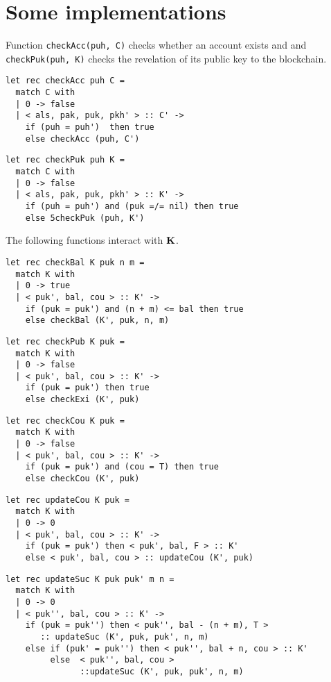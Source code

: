 \documentclass[a4paper]{llncs}
\begin{document}
\section{Some implementations}
Function \verb!checkAcc(puh, C)! checks whether an account exists and and \verb!checkPuk(puh, K)! checks the revelation of its public key to the blockchain.
\begin{verbatim}
let rec checkAcc puh C =
  match C with
  | 0 -> false
  | < als, pak, puk, pkh' > :: C' ->
    if (puh = puh')  then true 
    else checkAcc (puh, C')
\end{verbatim}

\begin{verbatim}
let rec checkPuk puh K =
  match C with
  | 0 -> false
  | < als, pak, puk, pkh' > :: K' ->
    if (puh = puh') and (puk =/= nil) then true 
    else 5checkPuk (puh, K')
\end{verbatim}

The following functions interact with $\textbf{K}$. 

\begin{verbatim}
let rec checkBal K puk n m =
  match K with
  | 0 -> true
  | < puk', bal, cou > :: K' ->
    if (puk = puk') and (n + m) <= bal then true 
    else checkBal (K', puk, n, m)
\end{verbatim}

\begin{verbatim}
let rec checkPub K puk =
  match K with
  | 0 -> false
  | < puk', bal, cou > :: K' ->
    if (puk = puk') then true 
    else checkExi (K', puk)
\end{verbatim}

\begin{verbatim}
let rec checkCou K puk =
  match K with
  | 0 -> false
  | < puk', bal, cou > :: K' ->
    if (puk = puk') and (cou = T) then true 
    else checkCou (K', puk)
\end{verbatim}

\begin{verbatim}
let rec updateCou K puk =
  match K with
  | 0 -> 0
  | < puk', bal, cou > :: K' ->
    if (puk = puk') then < puk', bal, F > :: K'
    else < puk', bal, cou > :: updateCou (K', puk)
\end{verbatim}

\begin{verbatim}
let rec updateSuc K puk puk' m n =
  match K with
  | 0 -> 0
  | < puk'', bal, cou > :: K' ->
    if (puk = puk'') then < puk'', bal - (n + m), T > 
       :: updateSuc (K', puk, puk', n, m)
    else if (puk' = puk'') then < puk'', bal + n, cou > :: K'
         else  < puk'', bal, cou > 
               ::updateSuc (K', puk, puk', n, m)
\end{verbatim}
\end{document}
